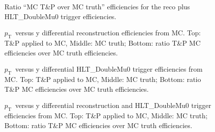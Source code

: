 \documentclass[12pt]{article}
\newcommand{\pt}{$p_{\mathrm{T}}$}
\begin{document}
\begin{figure}[htbp]
\centering
{}
\caption{Ratio ``MC T\&P over MC truth'' efficiencies for the reco
  plus HLT\_DoubleMu0 trigger efficiencies.}
\end{figure}


\begin{figure}[htbp]
\centering
{}
\caption{\pt\ versus y differential reconstruction efficiencies from
  MC. Top: T\&P applied to MC, Middle: MC truth; Bottom: ratio T\&P
  MC efficiencies over MC truth efficiencies.}
\end{figure}

\begin{figure}[htbp]
\centering
{}
\caption{\pt\ versus y differential HLT\_DoubleMu0 trigger efficiencies
  from MC. Top: T\&P applied to MC, Middle: MC truth; Bottom: ratio
  T\&P MC efficiencies over MC truth efficiencies.}
\end{figure}

\begin{figure}[htbp]
\centering
{}
\caption{\pt\ versus y differential reconstruction and HLT\_DoubleMu0
  trigger efficiencies from
  MC. Top: T\&P applied to MC, Middle: MC truth; Bottom: ratio T\&P
  MC efficiencies over MC truth efficiencies.}
\end{figure}
\end{document}
